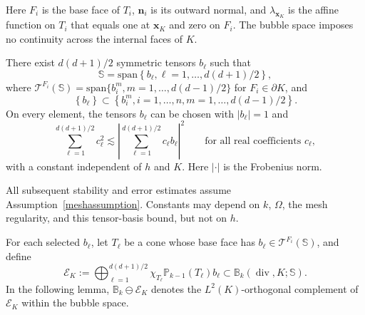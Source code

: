 \documentclass[review,hidelinks,onefignum,onetabnum]{siamart251216}
\newcommand{\AI}[1]{{\color{blue}#1}}
\begin{document}
\AI{Here $F_i$ is the base face of $T_i$, $\boldsymbol n_i$ is its outward normal,
and $\lambda_{\boldsymbol x_K}$ is the affine function on $T_i$ that equals
one at $\boldsymbol x_K$ and zero on $F_i$. The bubble space imposes no
continuity across the internal faces of $K$.}

\begin{assumption}\label{meshassumption}
There exist $d(d+1)/2$ symmetric tensors $b_\ell$ such that
\begin{equation}
\mathbb{S}=\text{span}\left\{ b_{\ell}, \ell=1,\ldots,d(d+1)/2\right\},\label{equ_assumption_ddpolytope}
\end{equation}
where $\mathscr T^{F_i}(\mathbb S)=\textrm{span}\{ b_i^{m}, m=1,\ldots,d(d-1)/2\}$ for $F_i\in \partial K$, and 
\begin{equation}
\left\{ b_\ell\right\} \subset \left\{ b_i^m, i=1,\ldots,n, m=1,\ldots,d(d-1)/2\right\}.\label{equ_edge_vector_property}
\end{equation}
\AI{On every element, the tensors $b_\ell$ can be chosen with
$|b_\ell|=1$ and
\[
\sum_{\ell=1}^{d(d+1)/2}c_\ell^2
\lesssim\left|\sum_{\ell=1}^{d(d+1)/2}c_\ell b_\ell\right|^2
\qquad\text{for all real coefficients }c_\ell,
\]
with a constant independent of $h$ and $K$. Here $|\cdot|$ is the Frobenius norm.}
\end{assumption}
\AI{All subsequent stability and error estimates assume
Assumption~\ref{meshassumption}. Constants may depend on $k$, $\Omega$, the
mesh regularity, and this tensor-basis bound, but not on $h$.}

\AI{For each selected $b_\ell$, let $T_\ell$ be a cone whose base face
has $b_\ell\in\mathscr T^{F_i}(\mathbb S)$, and define
\[
\mathcal E_K:=\bigoplus_{\ell=1}^{d(d+1)/2}
\chi_{T_\ell}\mathbb P_{k-1}(T_\ell)b_\ell
\subset\mathbb B_k(\operatorname{div},K;\mathbb S).
\]
In the following lemma, $\mathbb B_k\ominus\mathcal E_K$ denotes the
$L^2(K)$-orthogonal complement of $\mathcal E_K$ within the bubble space.}
\end{document}
